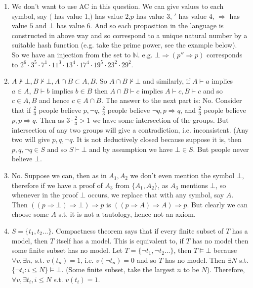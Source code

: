 \begin{enumerate}
\item We don't want to use AC in this question. We can give values to each symbol, say $($ has value 1,$)$ has value $2$,$p$ has value $3$, $'$ has value $4$, $\Rightarrow$ has value $5$ and $\bot$ has value $6$. And so each proposition in the language is constructed in above way and so correspond to a unique natural number by a suitable hash function (e.g. take the prime power, see the example below).\\
    So we have an injection from the set to $\mathbb{N}$. e.g. $\bot \Rightarrow (p'' \Rightarrow p)$ corresponds to $2^6 \cdot 3^5 \cdot 7^1 \cdot 11^3 \cdot 13^4 \cdot 17^4 \cdot 19^5 \cdot 23^2 \cdot 29^2$.
\item $A \not \vdash \bot, B \not \vdash \bot, A \cap B \subset A,B$. So $A \cap B \not \vdash \bot$ and similarly, if $A \vdash a$ implies $a \in A$, $B \vdash b$ implies $b \in B$ then $A \cap B \vdash c$ implies $A \vdash c, B \vdash c$ and so $c \in A,B$ and hence $c \in A \cap B$. The answer to the next part is: No. Consider that if $\frac{2}{3}$ people believe $p,\neg q$, $\frac{2}{3}$ people believe $\neg q, p \Rightarrow q$, and $\frac{2}{3}$ people believe $p, p \Rightarrow q$. Then as $3 \cdot \frac{2}{3} >1$ we have some intersection of the groups. But intersection of any two groups will give a contradiction, i.e. inconsistent. (Any two will give $p, q, \neg q$. It is not deductively closed because suppose it is, then $p, q, \neg q \in S$ and so $S \vdash \bot$ and by assumption we have $\bot \in S$. But people never believe $\bot$.\\
\item No. Suppose we can, then as in $A_1,A_2$ we don't even mention the symbol $\bot$, therefore if we have a proof of $A_3$ from $\{A_1, A_2 \}$, as $A_3$ mentions $\bot$, so whenever in the proof $\bot$ occurs, we replace that with any symbol, say $A$. Then $((p \Rightarrow \bot) \Rightarrow \bot) \Rightarrow p$ is $((p \Rightarrow A) \Rightarrow A) \Rightarrow p$. But clearly we can choose some $A$ s.t. it is not a tautology, hence not an axiom.\\
\item $S=\{t_1,t_2 \ldots\}$. Compactness theorem says that if every finite subset of $T$ has a model, then $T$ itself has a model. This is equivalent to, if $T$ has no model then some finite subset has no model. Let $T=\{\neg t_1, \neg t_2 \ldots\}$, then $T \models \bot$ because $\forall v, \exists n$, s.t. $v(t_n)=1$, i.e. $v(\neg t_n)=0$ and so $T$ has no model. Then $\exists N$ s.t. $\{\neg t_i: i \le N\} \models \bot$. (Some finite subset, take the largest $n$ to be $N$). Therefore, $\forall v, \exists t_i, i \le N$ s.t. $v(t_i)=1$.\\

\end{enumerate}
